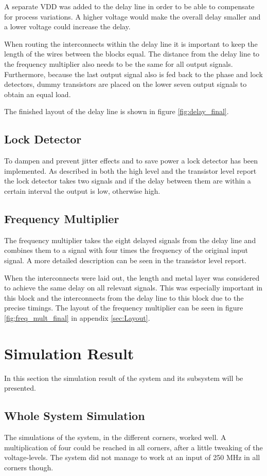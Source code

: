 \documentclass[a4paper,12pt]{article} \usepackage{graphicx}
\begin{document}
A separate VDD was added to the delay line in order to be able to compensate for
process variations. A higher voltage would make the overall delay smaller and a
lower voltage could increase the delay.

When routing the interconnects within the delay line it is important to keep the
length of the wires between the blocks equal. The distance from the delay line
to the frequency multiplier also needs to be the same for all output signals.
Furthermore, because the last output signal also is fed back to the phase and
lock detectors, dummy transistors are placed on the lower seven output signals
to obtain an equal load.

The finished layout of the delay line is shown in figure \ref{fig:delay_final}.

\subsection{Lock Detector}
To dampen and prevent jitter effects and to save power a lock detector
has been implemented. As described in both the high level and the
transistor level report the lock detector takes two signals and if
the delay between them are within a certain interval the output is
low, otherwise high.
\subsection{Frequency Multiplier}
The frequency multiplier takes the eight delayed signals from the delay line and
combines them to a signal with four times the frequency of the original input
signal. A more detailed description can be seen in the transistor level report\cite{transistor}.

When the interconnects were laid out, the length and metal layer was considered
to achieve the same delay on all relevant signals. This was especially important
in this block and the interconnects from the delay line to this block due to
the precise timings. The layout of the frequency multiplier can be seen in
figure \ref{fig:freq_mult_final} in appendix \ref{sec:Layout}.


\section{Simulation Result}
In this section the simulation result of the system and its subsystem will be
presented.

\subsection{Whole System Simulation}
The simulations of the system, in the different corners, worked well. A multiplication
of four could be reached in all corners, after a little tweaking of the voltage-levels.
The system did not manage to work at an input of 250 MHz in all corners though.
\end{document}
